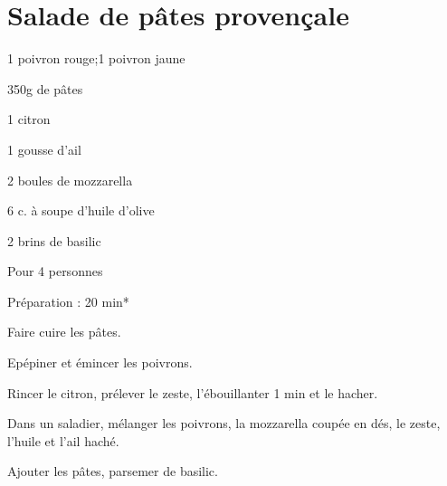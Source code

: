\section[\normalsize{Salade de p\^ates provençale}]{Salade de p\^ates provençale}		%

\begin{ingredients}
\item 1 poivron rouge;1 poivron jaune
\item 350g de p\^ates
\item 1 citron
\item 1 gousse d'ail
\item 2 boules de mozzarella
\item 6 c. \`a soupe d'huile d'olive
\item 2 brins de basilic
\end{ingredients}
\begin{infos}
\item Pour 4 personnes
\item Préparation : 20 min*
\end{infos}
\begin{etapes}
\item Faire cuire les p\^ates.
\item Ep\'epiner et \'emincer les poivrons.
\item Rincer le citron, pr\'elever le zeste, l'\'ebouillanter 1 min et le hacher.
\item Dans un saladier, m\'elanger les poivrons, la mozzarella coup\'ee en d\'es, le zeste, l'huile et l'ail hach\'e.
\item Ajouter les p\^ates, parsemer de basilic.
\end{etapes}
\begin{conseils}
\end{conseils}


